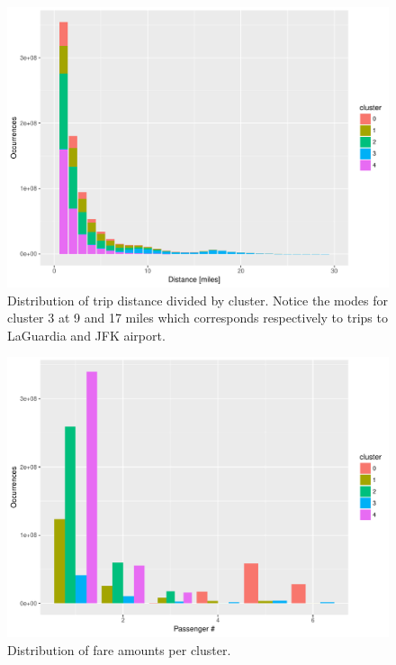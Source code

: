 \documentclass{acm_proc_article-sp-sigmod09}
\begin{document}
\begin{figure}
	\centering
	\includegraphics[width=1\columnwidth]{resources/clustered_plots/trip_distance_distr.pdf}
	\caption{Distribution of trip distance divided by cluster. Notice the modes for cluster 3 at 9 and 17 miles which corresponds respectively to trips to LaGuardia and JFK airport.}
	\label{fig:clusterDistance}
\end{figure}
\begin{figure}
	\centering
	\includegraphics[width=1\columnwidth]{resources/clustered_plots/passenger_count_distr.pdf}
	\caption{Distribution of fare amounts per cluster.}
	\label{fig:clusterPassengerDistr}
\end{figure}
\end{document}
